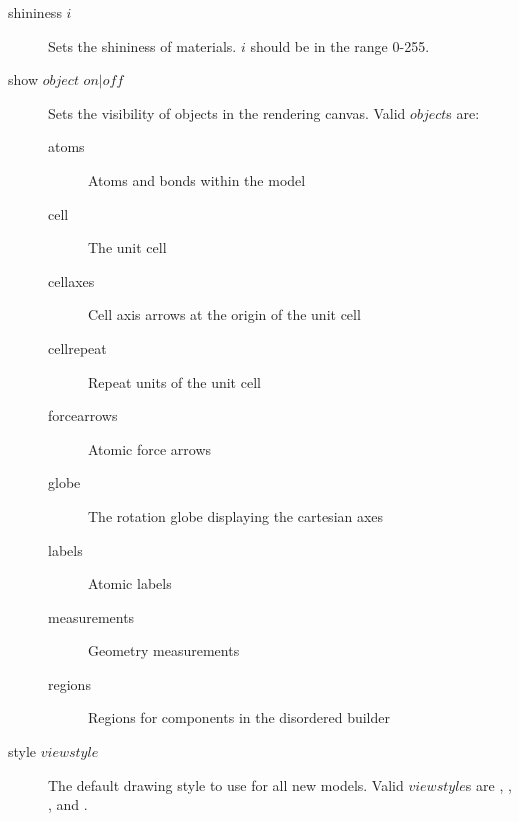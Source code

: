 \begin{description}
	\item[shininess $i$\its]
		Sets the shininess of materials. $i$ should be in the range 0-255.
	
	\item[show $object$ $on|off$\its]
		Sets the visibility of objects in the rendering canvas. Valid $object$s are:
		\begin{description}
			\item[atoms] Atoms and bonds within the model
			\item[cell] The unit cell
			\item[cellaxes] Cell axis arrows at the origin of the unit cell
			\item[cellrepeat] Repeat units of the unit cell
			\item[forcearrows] Atomic force arrows
			\item[globe] The rotation globe displaying the cartesian axes
			\item[labels] Atomic labels
			\item[measurements] Geometry measurements
			\item[regions] Regions for components in the disordered builder
		\end{description}

	\item[style $viewstyle$\its]
		The default drawing style to use for all new models. Valid $viewstyle$s are , , , and .

\end{description}


